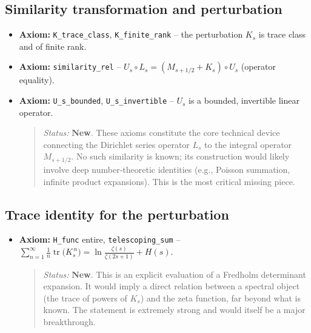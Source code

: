 \documentclass{article}
\begin{document}
\subsection{Similarity transformation and perturbation}
\begin{itemize}
  \item \textbf{Axiom:} \texttt{K\_trace\_class}, \texttt{K\_finite\_rank} – the perturbation $K_s$ is trace class and of finite rank.
  \item \textbf{Axiom:} \texttt{similarity\_rel} – $U_s \circ L_s = (M_{s+1/2} + K_s) \circ U_s$ (operator equality).
  \item \textbf{Axiom:} \texttt{U\_s\_bounded}, \texttt{U\_s\_invertible} – $U_s$ is a bounded, invertible linear operator.
  \begin{quote}
    \emph{Status:} \textbf{New}.  These axioms constitute the core technical device connecting the Dirichlet series operator $L_s$ to the integral operator $M_{s+1/2}$.  No such similarity is known; its construction would likely involve deep number‑theoretic identities (e.g., Poisson summation, infinite product expansions).  This is the most critical missing piece.
  \end{quote}
\end{itemize}

\subsection{Trace identity for the perturbation}
\begin{itemize}
  \item \textbf{Axiom:} \texttt{H\_func} entire, \texttt{telescoping\_sum} – 
  \(\displaystyle \sum_{n=1}^\infty \frac{1}{n} \operatorname{tr}\bigl(K_s^{\,n}\bigr) = \ln\frac{\zeta(s)}{\zeta(2s+1)} + H(s)\).
  \begin{quote}
    \emph{Status:} \textbf{New}.  This is an explicit evaluation of a Fredholm determinant expansion.  It would imply a direct relation between a spectral object (the trace of powers of $K_s$) and the zeta function, far beyond what is known.  The statement is extremely strong and would itself be a major breakthrough.
  \end{quote}
\end{itemize}
\end{document}
